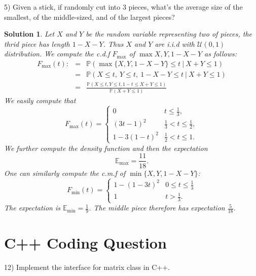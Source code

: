 \documentclass[12pt]{article}
\newtheorem{solution}[theorem]{Solution}
\begin{document}
5) Given a stick, if randomly cut into 3 pieces, what's the average size of the smallest, of the middle-sized, and of the largest pieces?
\begin{solution}Let $X$ and $Y$ be the random variable representing two of pieces, the thrid piece has length $1-X-Y$. Thus $X$ and $Y$ are i.i.d with $\mathcal{U}(0,1)$ distribution. We compute the c.d.f $F_{\max}$ of $\max{X,Y,1-X-Y}$ as follows:
\begin{eqnarray*}F_{\max}(t):&=&\mathbb{P}(\max\{X,Y,1-X-Y\}\le t\ |\ X+Y\le1)\\
&=&\mathbb{P}(X\le t,\ Y\le t,\ 1-X-Y\le t\ |\  X+Y\le1)\\
&=&\frac{\mathbb{P}(X\le t, Y\le t, 1-t\le X+Y\le 1)}{\mathbb{P}(X+Y\le 1)}
\end{eqnarray*}
We easily compute that 
 $$F_{\max}(t)=\begin{cases}0& t\le \frac{1}{3},\\ (3t-1)^2 & \frac{1}{3}<t\le \frac{1}{2},\\ {1}-{3}(1-t)^2 &\frac{1}{2}<t\le1.
\end{cases}
$$
We further compute the density function and then the expectation $$\mathbb{E}_{\max}=\frac{11}{18}.$$
One can similarly compute the c.m.f of $\min\{X,Y,1-X-Y\}$:
$$F_{\min}(t)=\begin{cases}1-(1-3t)^2 & 0\le t\le \frac{1}{3}\\
1 & t>\frac{1}{3}.
\end{cases}
$$
The expectation is $\mathbb{E}_{\min}=\frac{1}{9}$. The middle piece therefore has expectation $\frac{5}{18}$.

\end{solution}


\section*{C++ Coding Question}

12) Implement the interface for matrix class in C++.
\end{document}
